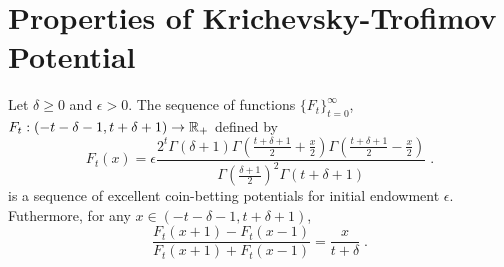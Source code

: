 \section{Properties of Krichevsky-Trofimov Potential}

\begin{theorem}[KT potential]
\label{theorem:kt-potential}
Let $\delta \ge 0$ and $\epsilon > 0$. The sequence of functions
$\{F_t\}_{t=0}^\infty$, $F_t:(-t-\delta-1, t+\delta+1) \to \mathbb{R}_+$ defined by
$$
F_t(x) = \epsilon \frac{2^t \Gamma(\delta + 1) \Gamma(\frac{t+\delta+1}{2} + \frac{x}{2}) \Gamma(\frac{t+\delta+1}{2} - \frac{x}{2})}{\Gamma(\frac{\delta+1}{2})^2 \Gamma(t+\delta+1)} \; .
$$
is a sequence of excellent coin-betting potentials for initial endowment $\epsilon$.
Futhermore, for any $x \in (-t-\delta-1, t+\delta+1)$,
$$
\frac{F_t(x+1) - F_{t}(x-1)}{F_t(x+1) + F_{t}(x-1)} = \frac{x}{t+\delta} \; .
$$
\end{theorem}

